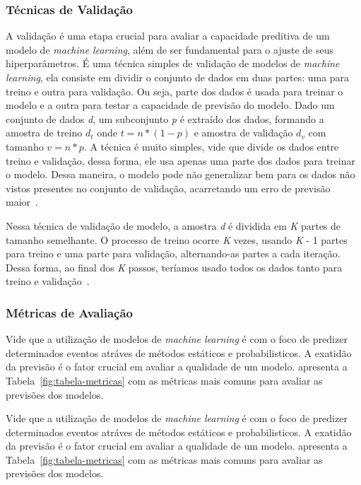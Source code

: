         \subsubsection{Técnicas de Validação}
        A validação é uma etapa crucial para avaliar a capacidade preditiva de um modelo de 
        \emph{machine learning}, além de ser fundamental para o ajuste de seus hiperparâmetros.
            É uma técnica simples de validação de modelos de \emph{machine learning}, ela consiste em dividir
            o conjunto de dados em duas partes: uma para treino e outra para validação. Ou seja, parte dos 
            dados é usada para treinar o modelo e a outra para testar a capacidade de previsão do modelo. 
            Dado um conjunto de dados \emph{d}, um subconjunto \emph{p} é extraído dos dados, formando 
            a amostra de treino \(d_t\) onde \(t = n * (1 - p)\) e amostra de validação \(d_v\) com tamanho
            \(v = n * p\). 
            A técnica é muito simples, vide que divide os dados entre treino e validação, dessa forma, ele
            usa apenas uma parte dos dados para treinar o modelo. Dessa maneira, o modelo pode não generalizar
            bem para os dados não vistos presentes no conjunto de validação, acarretando um erro de previsão
            maior~\cite{cunha2019}.

            Nessa técnica de validação de modelo, a amostra \emph{d} é dividida em \emph{K} partes de tamanho
            semelhante. O processo de treino ocorre \emph{K} vezes, usando \emph{K} - 1 partes para treino e
            uma parte para validação, alternando-as partes a cada iteração. Dessa forma, ao final dos \emph{K}
            passos, teríamos usado todos os dados tanto para treino e validação~\cite{cunha2019}.
        \subsubsection{Métricas de Avaliação}
            Vide que a utilização de modelos de \emph{machine learning} é com o foco de predizer determinados eventos atráves
            de métodos estáticos e probabilisticos. A exatidão da previsão é o fator crucial em avaliar a qualidade de um modelo.
             apresenta a Tabela~\ref{fig:tabela-metricas} com as métricas mais comuns para avaliar as previsões
            dos modelos.
            
            Vide que a utilização de modelos de \emph{machine learning} é com o foco de predizer determinados eventos atráves
            de métodos estáticos e probabilisticos. A exatidão da previsão é o fator crucial em avaliar a qualidade de um modelo.
             apresenta a Tabela~\ref{fig:tabela-metricas} com as métricas mais comuns para avaliar as previsões
            dos modelos.
            
